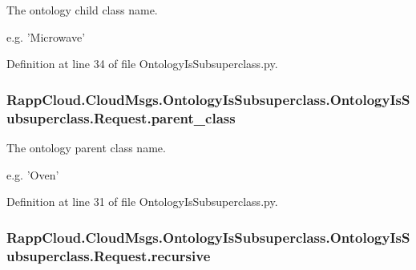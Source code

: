 The ontology child class name. 

e.\-g. 'Microwave' 

Definition at line 34 of file Ontology\-Is\-Subsuperclass.\-py.

\hypertarget{classRappCloud_1_1CloudMsgs_1_1OntologyIsSubsuperclass_1_1OntologyIsSubsuperclass_1_1Request_a5a03232dfee7cbcc64f71b04dc8bc232}{
\subsubsection[{parent\-\_\-class}]{\setlength{\rightskip}{0pt plus 5cm}Rapp\-Cloud.\-Cloud\-Msgs.\-Ontology\-Is\-Subsuperclass.\-Ontology\-Is\-Subsuperclass.\-Request.\-parent\-\_\-class}}\label{classRappCloud_1_1CloudMsgs_1_1OntologyIsSubsuperclass_1_1OntologyIsSubsuperclass_1_1Request_a5a03232dfee7cbcc64f71b04dc8bc232}


The ontology parent class name. 

e.\-g. 'Oven' 

Definition at line 31 of file Ontology\-Is\-Subsuperclass.\-py.

\hypertarget{classRappCloud_1_1CloudMsgs_1_1OntologyIsSubsuperclass_1_1OntologyIsSubsuperclass_1_1Request_a3a8614ebafb8401bc76150b64a2db4a7}{
\subsubsection[{recursive}]{\setlength{\rightskip}{0pt plus 5cm}Rapp\-Cloud.\-Cloud\-Msgs.\-Ontology\-Is\-Subsuperclass.\-Ontology\-Is\-Subsuperclass.\-Request.\-recursive}}\label{classRappCloud_1_1CloudMsgs_1_1OntologyIsSubsuperclass_1_1OntologyIsSubsuperclass_1_1Request_a3a8614ebafb8401bc76150b64a2db4a7}


